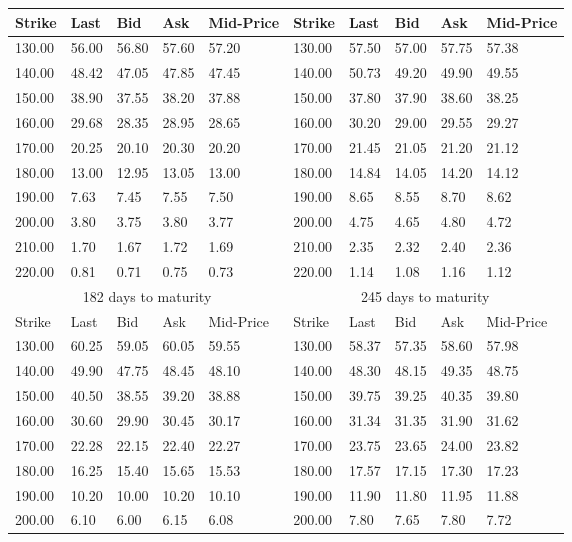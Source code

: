 \documentclass[a4paper, 12pt]{report}
\begin{document}
\begin{appendices}
\begin{longtable}{|lllll|lllll|}
    \hline
  Strike & Last & Bid & Ask & Mid-Price & Strike & Last & Bid & Ask & Mid-Price \\
  \hline
  130.00 & 56.00 & 56.80 & 57.60 & 57.20 &  130.00 & 57.50 & 57.00 & 57.75 & 57.38 \\*
  140.00 & 48.42 & 47.05 & 47.85 & 47.45 &  140.00 & 50.73 & 49.20 & 49.90 & 49.55 \\*
  150.00 & 38.90 & 37.55 & 38.20 & 37.88 &  150.00 & 37.80 & 37.90 & 38.60 & 38.25 \\*
  160.00 & 29.68 & 28.35 & 28.95 & 28.65 &  160.00 & 30.20 & 29.00 & 29.55 & 29.27 \\*
  170.00 & 20.25 & 20.10 & 20.30 & 20.20 &  170.00 & 21.45 & 21.05 & 21.20 & 21.12 \\*
  180.00 & 13.00 & 12.95 & 13.05 & 13.00 &  180.00 & 14.84 & 14.05 & 14.20 & 14.12 \\*
  190.00 & 7.63 & 7.45 & 7.55 & 7.50 &  190.00 & 8.65 & 8.55 & 8.70 & 8.62 \\*
  200.00 & 3.80 & 3.75 & 3.80 & 3.77 &  200.00 & 4.75 & 4.65 & 4.80 & 4.72 \\*
  210.00 & 1.70 & 1.67 & 1.72 & 1.69 &  210.00 & 2.35 & 2.32 & 2.40 & 2.36 \\*
  220.00 & 0.81 & 0.71 & 0.75 & 0.73 &  220.00 & 1.14 & 1.08 & 1.16 & 1.12 \\
  \hline
  \multicolumn{5}{|c|}{182 days to maturity} & \multicolumn{5}{c|}{245 days to maturity} \\*
  \hline
  Strike & Last & Bid & Ask & Mid-Price & Strike & Last & Bid & Ask & Mid-Price \\*
  \hline
  130.00 & 60.25 & 59.05 & 60.05 & 59.55 &  130.00 & 58.37 & 57.35 & 58.60 & 57.98 \\*
  140.00 & 49.90 & 47.75 & 48.45 & 48.10 &  140.00 & 48.30 & 48.15 & 49.35 & 48.75 \\*
  150.00 & 40.50 & 38.55 & 39.20 & 38.88 &  150.00 & 39.75 & 39.25 & 40.35 & 39.80 \\*
  160.00 & 30.60 & 29.90 & 30.45 & 30.17 &  160.00 & 31.34 & 31.35 & 31.90 & 31.62 \\*
  170.00 & 22.28 & 22.15 & 22.40 & 22.27 &  170.00 & 23.75 & 23.65 & 24.00 & 23.82 \\*
  180.00 & 16.25 & 15.40 & 15.65 & 15.53 &  180.00 & 17.57 & 17.15 & 17.30 & 17.23 \\*
  190.00 & 10.20 & 10.00 & 10.20 & 10.10 &  190.00 & 11.90 & 11.80 & 11.95 & 11.88 \\*
  200.00 & 6.10 & 6.00 & 6.15 & 6.08 &  200.00 & 7.80 & 7.65 & 7.80 & 7.72 \\*

\end{longtable}
\end{appendices}
\end{document}
